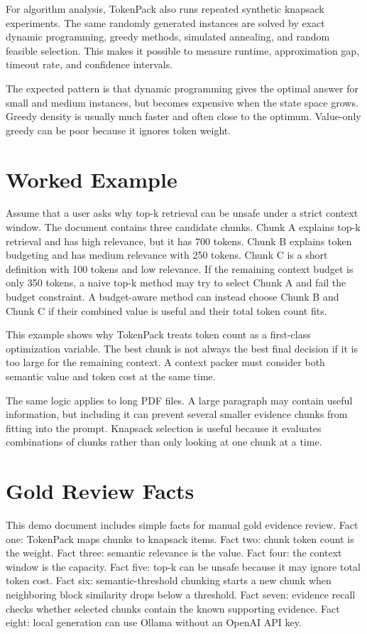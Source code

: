 \documentclass[11pt]{article}
\begin{document}
For algorithm analysis, TokenPack also runs repeated synthetic knapsack experiments. The same randomly generated instances are solved by exact dynamic programming, greedy methods, simulated annealing, and random feasible selection. This makes it possible to measure runtime, approximation gap, timeout rate, and confidence intervals.

The expected pattern is that dynamic programming gives the optimal answer for small and medium instances, but becomes expensive when the state space grows. Greedy density is usually much faster and often close to the optimum. Value-only greedy can be poor because it ignores token weight.

\section{Worked Example}
Assume that a user asks why top-k retrieval can be unsafe under a strict context window. The document contains three candidate chunks. Chunk A explains top-k retrieval and has high relevance, but it has 700 tokens. Chunk B explains token budgeting and has medium relevance with 250 tokens. Chunk C is a short definition with 100 tokens and low relevance. If the remaining context budget is only 350 tokens, a naive top-k method may try to select Chunk A and fail the budget constraint. A budget-aware method can instead choose Chunk B and Chunk C if their combined value is useful and their total token count fits.

This example shows why TokenPack treats token count as a first-class optimization variable. The best chunk is not always the best final decision if it is too large for the remaining context. A context packer must consider both semantic value and token cost at the same time.

The same logic applies to long PDF files. A large paragraph may contain useful information, but including it can prevent several smaller evidence chunks from fitting into the prompt. Knapsack selection is useful because it evaluates combinations of chunks rather than only looking at one chunk at a time.

\section{Gold Review Facts}
This demo document includes simple facts for manual gold evidence review. Fact one: TokenPack maps chunks to knapsack items. Fact two: chunk token count is the weight. Fact three: semantic relevance is the value. Fact four: the context window is the capacity. Fact five: top-k can be unsafe because it may ignore total token cost. Fact six: semantic-threshold chunking starts a new chunk when neighboring block similarity drops below a threshold. Fact seven: evidence recall checks whether selected chunks contain the known supporting evidence. Fact eight: local generation can use Ollama without an OpenAI API key.
\end{document}

